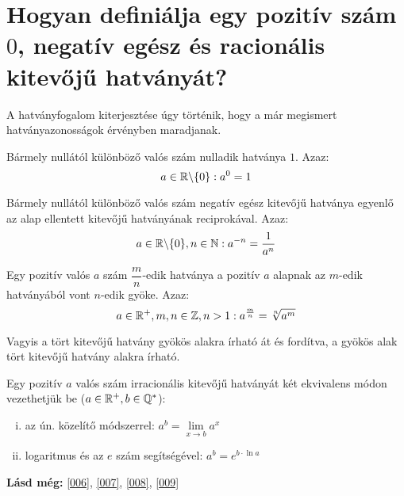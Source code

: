 
\section{Hogyan definiálja egy pozitív szám \texorpdfstring{$0$}{0}, negatív
  egész és racionális kitevőjű hatványát?}
\label{012}

A hatványfogalom kiterjesztése úgy történik, hogy a már megismert
hatványazonosságok érvényben maradjanak.

\begin{defin}
Bármely nullától különböző valós szám nulladik hatványa $1$. Azaz:
\[
  a \in \mathbb{R} \backslash \{0\}: a^0 = 1
\]
\end{defin}

\begin{defin}
Bármely nullától különböző valós szám negatív egész kitevőjű hatványa egyenlő
az alap ellentett kitevőjű hatványának reciprokával. Azaz:
\[
  a \in \mathbb{R} \backslash \{0\}, n \in \mathbb{N}: a^{-n} = \dfrac{1}{a^n}
\]
\end{defin}

\begin{defin}
Egy pozitív valós $a$ szám $\dfrac{m}{n}$-edik hatványa a pozitív $a$ alapnak
az $m$-edik hatványából vont $n$-edik gyöke. Azaz:
\[
  a \in \mathbb{R}^+, m, n \in \mathbb{Z}, n > 1: a^{\frac{m}{n}} = \sqrt[n]{a^m}
\]

Vagyis a tört kitevőjű hatvány gyökös alakra írható át és fordítva, a gyökös
alak tört kitevőjű hatvány alakra írható.
\end{defin}

\begin{defin4}
Egy pozitív $a$ valós szám irracionális kitevőjű hatványát két ekvivalens módon
vezethetjük be ($a \in \mathbb{R}^+, b \in \mathbb{Q^*}$):
\begin{enumerate}[i)]
\item az ún. közelítő módszerrel: $a^b = \lim\limits_{x \to b} a^x$
\item logaritmus és az $e$ szám segítségével: $a^b = e^{b \cdot \ln a}$
\end{enumerate}
\end{defin4}

\textbf{Lásd még:} \ref{006}, \ref{007}, \ref{008}, \ref{009}
